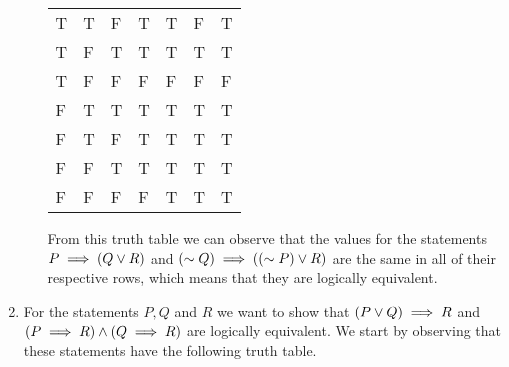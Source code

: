 \documentclass[12pt]{article}
\makeatletter
\newcommand*{\arabicodd}[1]{%
  \expandafter\@arabicodd\csname c@#1\endcsname
}
\newcommand*{\@arabicodd}[1]{%
  \@arabic{\numexpr(#1)*2-1\relax}%
}
\makeatother
\begin{document}
\begin{enumerate}[label=2.\arabicodd*, start=27]
\begin{enumerate}[label=(\alph*)]
\begin{minipage}{\linewidth}
\begin{tabular}{@{}lllllll@{}}
                    T & T & F & T          & T                           & F                     & T                                                 \\
                    T & F & T & T          & T                           & T                     & T                                                 \\
                    T & F & F & F          & F                           & F                     & F                                                 \\
                    F & T & T & T          & T                           & T                     & T                                                 \\
                    F & T & F & T          & T                           & T                     & T                                                 \\
                    F & F & T & T          & T                           & T                     & T                                                 \\
                    F & F & F & F          & T                           & T                     & T                                                 \\
                    \bottomrule
                  \end{tabular}
                \end{minipage}
                \linebreak
                \linebreak
                \linebreak
                \linebreak
                From this truth table we can observe that the values for the
                statements $P \implies \qty(Q \lor R)$ and $\qty(\sim Q) \implies \qty(\qty(\sim P) \lor R)$
                are the same in all of their respective rows, which means that
                they are logically equivalent.
        \end{enumerate}
  \item
        For the statements $P, Q$ and $R$ we want to show that $\qty(P \lor Q) \implies R$
        and $\qty(P \implies R) \land \qty(Q \implies R)$ are logically equivalent.
        We start by observing that these statements have the following
        truth table.
        \hfill
        \hfill
        \linebreak
        \linebreak

\end{enumerate}
\end{document}

